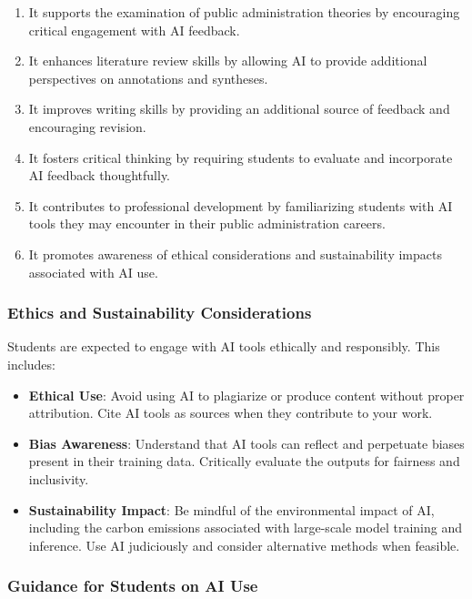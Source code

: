 \documentclass[12pt, letterpaper]{article}
\begin{document}
\begin{enumerate}
    \item It supports the examination of public administration theories by encouraging critical engagement with AI feedback.
    \item It enhances literature review skills by allowing AI to provide additional perspectives on annotations and syntheses.
    \item It improves writing skills by providing an additional source of feedback and encouraging revision.
    \item It fosters critical thinking by requiring students to evaluate and incorporate AI feedback thoughtfully.
    \item It contributes to professional development by familiarizing students with AI tools they may encounter in their public administration careers.
    \item It promotes awareness of ethical considerations and sustainability impacts associated with AI use.
\end{enumerate}

\subsubsection*{Ethics and Sustainability Considerations}

\noindent Students are expected to engage with AI tools ethically and responsibly. This includes:

\begin{itemize}
    \item \textbf{Ethical Use}: Avoid using AI to plagiarize or produce content without proper attribution. Cite AI tools as sources when they contribute to your work.
    \item \textbf{Bias Awareness}: Understand that AI tools can reflect and perpetuate biases present in their training data. Critically evaluate the outputs for fairness and inclusivity.
    \item \textbf{Sustainability Impact}: Be mindful of the environmental impact of AI, including the carbon emissions associated with large-scale model training and inference. Use AI judiciously and consider alternative methods when feasible.
\end{itemize}

\subsubsection*{Guidance for Students on AI Use}
\end{document}
